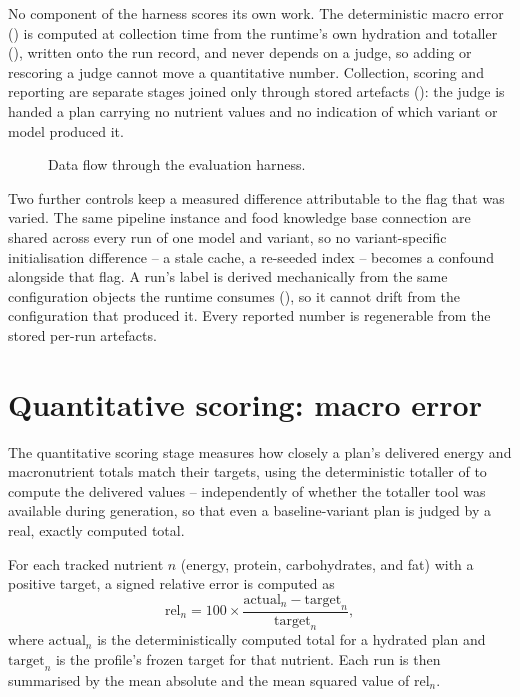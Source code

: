 No component of the harness scores its own work. The deterministic macro error () is computed at collection time from the runtime's own hydration and totaller (), written onto the run record, and never depends on a judge, so adding or rescoring a judge cannot move a quantitative number. Collection, scoring and reporting are separate stages joined only through stored artefacts (): the judge is handed a plan carrying no nutrient values and no indication of which variant or model produced it.

\begin{figure}[htbp]
    \centering
    
    \caption{Data flow through the evaluation harness.}
    \label{fig:diagram-eval-flow}
\end{figure}

Two further controls keep a measured difference attributable to the flag that was varied. The same pipeline instance and food knowledge base connection are shared across every run of one model and variant, so no variant-specific initialisation difference -- a stale cache, a re-seeded index -- becomes a confound alongside that flag. A run's label is derived mechanically from the same configuration objects the runtime consumes (), so it cannot drift from the configuration that produced it. Every reported number is regenerable from the stored per-run artefacts.

\section{Quantitative scoring: macro error}
\label{sec:methodology-quantitative}

The quantitative scoring stage measures how closely a plan's delivered energy and macronutrient totals match their targets, using the deterministic totaller of  to compute the delivered values -- independently of whether the totaller tool was available during generation, so that even a baseline-variant plan is judged by a real, exactly computed total.

For each tracked nutrient $n$ (energy, protein, carbohydrates, and fat) with a positive target, a signed relative error is computed as
\[
    \mathrm{rel}_n = 100 \times \frac{\mathrm{actual}_n - \mathrm{target}_n}{\mathrm{target}_n},
\]
where $\mathrm{actual}_n$ is the deterministically computed total for a hydrated plan and $\mathrm{target}_n$ is the profile's frozen target for that nutrient. Each run is then summarised by the mean absolute and the mean squared value of $\mathrm{rel}_n$.

